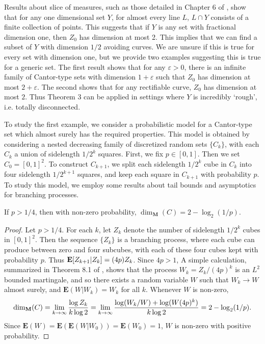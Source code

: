 Results about slice of measures, such as those detailed in Chapter 6 of \cite{Matilla}, show that for any one dimensional set $Y$, for almost every line $L$, $L \cap Y$ consists of a finite collection of points. This suggests that if $Y$ is any set with fractional dimension one, then $Z_0$ has dimension at most 2. This implies that we can find a subset of $Y$ with dimension $1/2$ avoiding curves. We are unsure if this is true for every set with dimension one, but we provide two examples suggesting this is true for a generic set. The first result shows that for any $\varepsilon > 0$, there is an infinite family of Cantor-type sets with dimension $1 + \varepsilon$ such that $Z_0$ has dimension at most $2 + \varepsilon$. The second shows that for any rectifiable curve, $Z_0$ has dimension at most $2$. Thus Theorem 3 can be applied in settings where $Y$ is incredibly `rough', i.e. totally disconnected.

To study the first example, we consider a probabilistic model for a Cantor-type set which almost surely has the required properties. This model is obtained by considering a nested decreasing family of discretized random sets $\{ C_k \}$, with each $C_k$ a union of sidelength $1/2^k$ squares. First, we fix $p \in [0,1]$. Then we set $C_0 = [0,1]^2$. To construct $C_{k+1}$, we split each sidelength $1/2^k$ cube in $C_k$ into four sidelength $1/2^{k+1}$ squares, and keep each square in $C_{k+1}$ with probability $p$. To study this model, we employ some results about tail bounds and asymptotics for branching processes.

\begin{lemma} \label{randomdimension}
	If $p > 1/4$, then with non-zero probability, $\dim_{\mathbf{M}}(C) = 2 - \log_2(1/p)$.
\end{lemma}
\begin{proof}
	Let $p > 1/4$. For each $k$, let $Z_k$ denote the number of sidelength $1/2^k$ cubes in $[0,1]^2$. Then the sequence $\{ Z_k \}$ is a branching process, where each cube can produce between zero and four subcubes, with each of these four cubes kept with probability $p$. Thus $\operatorname{\mathbf{E}}[Z_{k+1}|Z_k] = (4p) Z_k$. Since $4p > 1$, A simple calculation, summarized in Theorem 8.1 of \cite{Harris}, shows that the process $W_k = Z_k / (4p)^k$ is an $L^2$ bounded martingale, and so there exists a random variable $W$ such that $W_k \to W$ almost surely, and $\mathbf{E}(W|W_k) = W_k$ for all $k$. Whenever $W$ is non-zero,
	\[ \operatorname{\dim_{\mathbf{M}}}(C) = \lim_{k \to \infty} \frac{\log Z_k}{k \log 2} = \lim_{k \to \infty} \frac{\log(W_k/W) + \log(W (4p)^k)}{k \log 2} = 2 - \log_2(1/p). \]
	Since $\mathbf{E}(W) = \mathbf{E}(\mathbf{E}(W|W_0)) = \mathbf{E}(W_0) = 1$, $W$ is non-zero with positive probability.
\end{proof}

